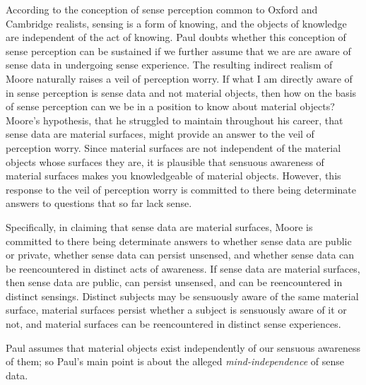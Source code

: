 \documentclass[11pt]{article}
\begin{document}
According to the conception of sense perception common to Oxford and Cambridge realists, sensing is a form of knowing, and the objects of knowledge are independent of the act of knowing. Paul doubts whether this conception of sense perception can be sustained if we further assume that we are are aware of sense data in undergoing sense experience. The resulting indirect realism of Moore naturally raises a veil of perception worry. If what I am directly aware of in sense perception is sense data and not material objects, then how on the basis of sense perception can we be in a position to know about material objects? Moore's hypothesis, that he struggled to maintain throughout his career, that sense data are material surfaces, might provide an answer to the veil of perception worry. Since material surfaces are not independent of the material objects whose surfaces they are, it is plausible that sensuous awareness of material surfaces makes you knowledgeable of material objects. However, this response to the veil of perception worry is committed to there being determinate answers to questions that so far lack sense.

Specifically, in claiming that sense data are material surfaces, Moore is committed to there being determinate answers to whether sense data are public or private, whether sense data can persist unsensed, and whether sense data can be reencountered in distinct acts of awareness. If sense data are material surfaces, then sense data are public, can persist unsensed, and can be reencountered in distinct sensings. Distinct subjects may be sensuously aware of the same material surface, material surfaces persist whether a subject is sensuously aware of it or not, and material surfaces can be reencountered in distinct sense experiences.

Paul assumes that material objects exist independently of our sensuous awareness of them; so Paul's main point is about the alleged \emph{mind-independence} of sense data.
\end{document}

